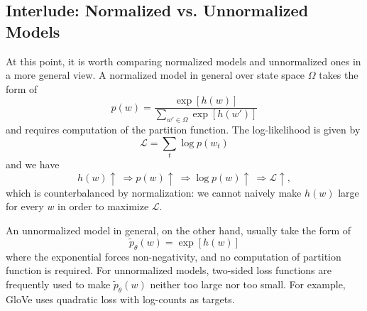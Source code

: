 \documentclass[../book-template.tex]{subfiles}
\begin{document}
\subsection{Interlude: Normalized vs. Unnormalized Models}
\par At this point, it is worth comparing normalized models and unnormalized ones in a more general view. A normalized model in general over state space $\Omega$ takes the form of
\begin{equation*}
	p(w)=\frac{\exp[h(w)]}{\sum_{w'\in \Omega}\exp[h(w')]}
\end{equation*}
and requires computation of the partition function. The log-likelihood is given by
\begin{equation*}
	\mathcal{L}=\sum_{t}\log p(w_t)
\end{equation*}
and we have
\begin{equation*}
	h(w)\uparrow\ \Longrightarrow p(w)\uparrow\ \Longrightarrow \log p(w)\uparrow\ \Longrightarrow \mathcal{L}\uparrow,
\end{equation*}
which is counterbalanced by normalization: we cannot naively make $h(w)$ large for every $w$ in order to maximize $\mathcal{L}$.
\par An unnormalized model in general, on the other hand, usually take the form of
\begin{equation*}
	\tilde{p}_{\theta}(w)=\exp[h(w)]
\end{equation*}
where the exponential forces non-negativity, and no computation of partition function is required. For unnormalized models, two-sided loss functions are frequently used to make $\tilde{p}_{\theta}(w)$ neither too large nor too small. For example, GloVe uses quadratic loss with log-counts as targets.
\end{document}

